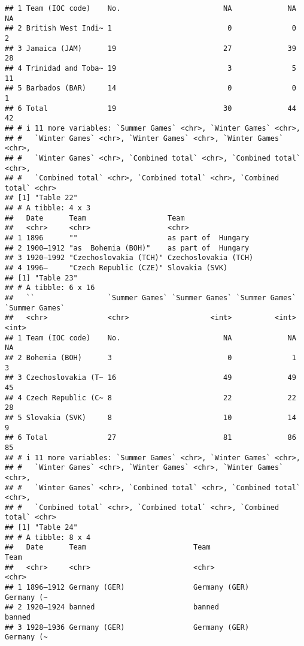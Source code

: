 \documentclass[
]{article}
\begin{document}
\begin{verbatim}
## 1 Team (IOC code)    No.                        NA             NA             NA
## 2 British West Indi~ 1                           0              0              2
## 3 Jamaica (JAM)      19                         27             39             28
## 4 Trinidad and Toba~ 19                          3              5             11
## 5 Barbados (BAR)     14                          0              0              1
## 6 Total              19                         30             44             42
## # i 11 more variables: `Summer Games` <chr>, `Winter Games` <chr>,
## #   `Winter Games` <chr>, `Winter Games` <chr>, `Winter Games` <chr>,
## #   `Winter Games` <chr>, `Combined total` <chr>, `Combined total` <chr>,
## #   `Combined total` <chr>, `Combined total` <chr>, `Combined total` <chr>
## [1] "Table 22"
## # A tibble: 4 x 3
##   Date      Team                   Team                
##   <chr>     <chr>                  <chr>               
## 1 1896      ""                     as part of  Hungary 
## 2 1900–1912 "as  Bohemia (BOH)"    as part of  Hungary 
## 3 1920–1992 "Czechoslovakia (TCH)" Czechoslovakia (TCH)
## 4 1996–     "Czech Republic (CZE)" Slovakia (SVK)      
## [1] "Table 23"
## # A tibble: 6 x 16
##   ``                 `Summer Games` `Summer Games` `Summer Games` `Summer Games`
##   <chr>              <chr>                   <int>          <int>          <int>
## 1 Team (IOC code)    No.                        NA             NA             NA
## 2 Bohemia (BOH)      3                           0              1              3
## 3 Czechoslovakia (T~ 16                         49             49             45
## 4 Czech Republic (C~ 8                          22             22             28
## 5 Slovakia (SVK)     8                          10             14              9
## 6 Total              27                         81             86             85
## # i 11 more variables: `Summer Games` <chr>, `Winter Games` <chr>,
## #   `Winter Games` <chr>, `Winter Games` <chr>, `Winter Games` <chr>,
## #   `Winter Games` <chr>, `Combined total` <chr>, `Combined total` <chr>,
## #   `Combined total` <chr>, `Combined total` <chr>, `Combined total` <chr>
## [1] "Table 24"
## # A tibble: 8 x 4
##   Date      Team                         Team                         Team      
##   <chr>     <chr>                        <chr>                        <chr>     
## 1 1896–1912 Germany (GER)                Germany (GER)                Germany (~
## 2 1920–1924 banned                       banned                       banned    
## 3 1928–1936 Germany (GER)                Germany (GER)                Germany (~

\end{verbatim}
\end{document}
